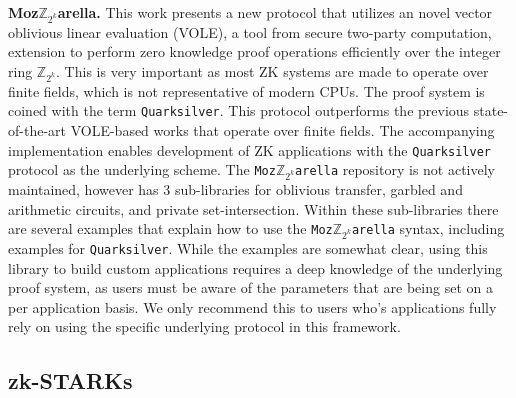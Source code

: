 \textbf{Moz$\mathbb{Z}_{2^k}$arella.}
This work \cite{baum2022moz} presents a new protocol that utilizes an novel vector oblivious linear evaluation (VOLE), a tool from secure two-party computation, extension to perform zero knowledge proof operations efficiently over the integer ring $\mathbb{Z}_{2^k}$. This is very important as most ZK systems are made to operate over finite fields, which is not representative of modern CPUs. The proof system is coined with the term \texttt{Quarksilver}. This protocol outperforms the previous state-of-the-art VOLE-based works that operate over finite fields. The accompanying implementation enables development of ZK applications with the \texttt{Quarksilver} protocol as the underlying scheme. The \texttt{Moz$\mathbb{Z}_{2^k}$arella} repository is not actively maintained, however has 3 sub-libraries for oblivious transfer, garbled and arithmetic circuits, and private set-intersection. Within these sub-libraries there are several examples that explain how to use the \texttt{Moz$\mathbb{Z}_{2^k}$arella} syntax, including examples for \texttt{Quarksilver}. While the examples are somewhat clear, using this library to build custom applications requires a deep knowledge of the underlying proof system, as users must be aware of the parameters that are being set on a per application basis. We only recommend this to users who's applications fully rely on using the specific underlying protocol in this framework.



\subsection{zk-STARKs}

